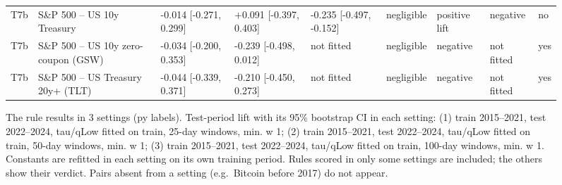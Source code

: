 \begin{figure}[t]
{\begin{tabular}{lllllllll}
T7b & S\&P 500 -- US 10y Treasury & -0.014 [-0.271, 0.299] & +0.091 [-0.397, 0.403] & -0.235 [-0.497, -0.152] & negligible & positive lift & negative & no \\
T7b & S\&P 500 -- US 10y zero-coupon (GSW) & -0.034 [-0.200, 0.353] & -0.239 [-0.498, 0.012] & not fitted & negligible & negative & not fitted & yes \\
T7b & S\&P 500 -- US Treasury 20y+ (TLT) & -0.044 [-0.339, 0.371] & -0.210 [-0.450, 0.273] & not fitted & negligible & negative & not fitted & yes \\
\bottomrule
\end{tabular}
}
\caption{The rule results in 3 settings (py labels). Test-period lift with its 95\% bootstrap CI in each setting: (1) train 2015–2021, test 2022–2024, tau/qLow fitted on train, 25-day windows, min. w 1; (2) train 2015–2021, test 2022–2024, tau/qLow fitted on train, 50-day windows, min. w 1; (3) train 2015–2021, test 2022–2024, tau/qLow fitted on train, 100-day windows, min. w 1. Constants are refitted in each setting on its own training period. Rules scored in only some settings are included; the others show their verdict. Pairs absent from a setting (e.g.\ Bitcoin before 2017) do not appear.}
\label{fig:robustness}
\end{figure}
